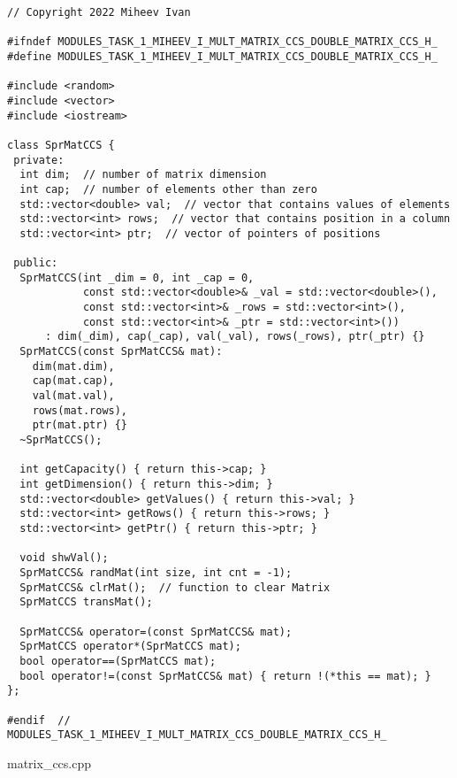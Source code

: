 \documentclass{report}
\begin{document}
\begin{lstlisting}
// Copyright 2022 Miheev Ivan

#ifndef MODULES_TASK_1_MIHEEV_I_MULT_MATRIX_CCS_DOUBLE_MATRIX_CCS_H_
#define MODULES_TASK_1_MIHEEV_I_MULT_MATRIX_CCS_DOUBLE_MATRIX_CCS_H_

#include <random>
#include <vector>
#include <iostream>

class SprMatCCS {
 private:
  int dim;  // number of matrix dimension
  int cap;  // number of elements other than zero
  std::vector<double> val;  // vector that contains values of elements
  std::vector<int> rows;  // vector that contains position in a column
  std::vector<int> ptr;  // vector of pointers of positions

 public:
  SprMatCCS(int _dim = 0, int _cap = 0,
            const std::vector<double>& _val = std::vector<double>(),
            const std::vector<int>& _rows = std::vector<int>(),
            const std::vector<int>& _ptr = std::vector<int>())
      : dim(_dim), cap(_cap), val(_val), rows(_rows), ptr(_ptr) {}
  SprMatCCS(const SprMatCCS& mat):
    dim(mat.dim),
    cap(mat.cap),
    val(mat.val),
    rows(mat.rows),
    ptr(mat.ptr) {}
  ~SprMatCCS();

  int getCapacity() { return this->cap; }
  int getDimension() { return this->dim; }
  std::vector<double> getValues() { return this->val; }
  std::vector<int> getRows() { return this->rows; }
  std::vector<int> getPtr() { return this->ptr; }

  void shwVal(); 
  SprMatCCS& randMat(int size, int cnt = -1);
  SprMatCCS& clrMat();  // function to clear Matrix
  SprMatCCS transMat();

  SprMatCCS& operator=(const SprMatCCS& mat);
  SprMatCCS operator*(SprMatCCS mat);
  bool operator==(SprMatCCS mat);
  bool operator!=(const SprMatCCS& mat) { return !(*this == mat); }
};

#endif  // MODULES_TASK_1_MIHEEV_I_MULT_MATRIX_CCS_DOUBLE_MATRIX_CCS_H_
\end{lstlisting}

matrix\_ccs.cpp
\end{document}
